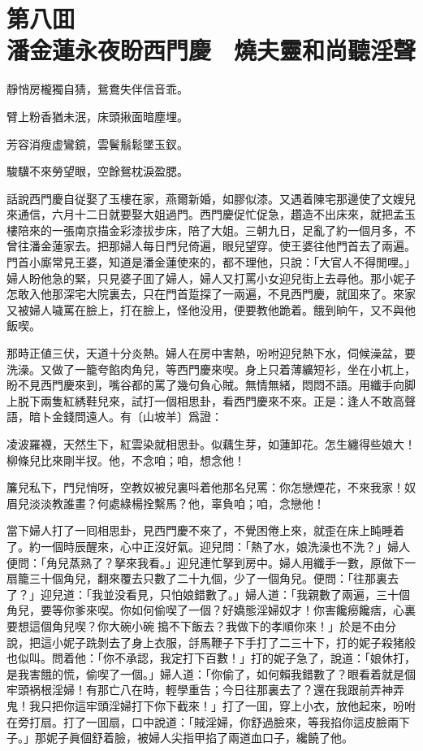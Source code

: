 
\chapter*{第八囬　\\潘金蓮永夜盼西門慶　燒夫靈和尚聽淫聲}


\begin{myquote}
靜悄房櫳獨自猜，鴛鴦失伴信音乖。

臂上粉香猶未泯，床頭揪面暗塵埋。

芳容消瘦虚鸞鏡，雲鬢鬅鬆墜玉釵。

駿驥不來勞望眼，空餘鴛枕淚盈腮。
\end{myquote}

話說西門慶自従娶了玉樓在家，燕爾新婚，如膠似漆。又遇着陳宅那邊使了文嫂兒來通信，六月十二日就要娶大姐過門。西門慶促忙促急，趲造不出床來，就把孟玉樓陪來的一張南京描金彩漆拔步床，陪了大姐。三朝九日，足亂了約一個月多，不曾往潘金蓮家去。把那婦人每日門兒倚遍，眼兒望穿。使王婆往他門首去了兩遍。門首小廝常見王婆，知道是潘金蓮使來的，都不理他，只說：「大官人不得閒哩。」婦人盼他急的緊，只見婆子囬了婦人，婦人又打罵小女迎兒街上去尋他。那小妮子怎敢入他那深宅大院裏去，只在門首踅探了一兩遍，不見西門慶，就囬來了。來家又被婦人噦罵在臉上，打在臉上，怪他没用，便要教他跪着。餓到晌午，又不與他飯喫。

那時正値三伏，天道十分炎熱。婦人在房中害熱，吩咐迎兒熱下水，伺候澡盆，要洗澡。又做了一籠夸餡肉角兒，等西門慶來喫。身上只着薄纊短衫，坐在小杌上，盼不見西門慶來到，嘴谷都的罵了幾句負心賊。無情無緒，悶悶不語。用纖手向脚上脱下兩隻紅綉鞋兒來，試打一個相思卦，看西門慶來不來。正是：逢人不敢高聲語，暗卜金錢問遠人。有〔山坡羊〕爲證：

\begin{myquote}
凌波羅襪，天然生下，紅雲染就相思卦。似藕生芽，如蓮卸花。怎生纏得些娘大！柳條兒比來剛半扠。他，不念咱；咱，想念他！

簾兒私下，門兒悄呀，空教奴被兒裏呌着他那名兒罵：你怎戀煙花，不來我家！奴眉兒淡淡教誰畫？何處綠楊拴繫馬？他，辜負咱；咱，念戀他！
\end{myquote}

當下婦人打了一囘相思卦，見西門慶不來了，不覺困倦上來，就歪在床上盹睡着了。約一個時辰醒來，心中正沒好氣。迎兒問：「熱了水，娘洗澡也不洗？」婦人便問：「角兒蒸熟了？拏來我看。」迎兒連忙拏到房中。婦人用纖手一數，原做下一扇籠三十個角兒，翻來覆去只數了二十九個，少了一個角兒。便問：「往那裏去了？」迎兒道：「我並没看見，只怕娘錯數了。」婦人道：「我親數了兩遍，三十個角兒，要等你爹來喫。你如何偷喫了一個？好嬌態淫婦奴才！你害饞癆饞痞，心裏要想這個角兒喫？你大碗小碗𠳹搗不下飯去？我做下的孝順你來！」於是不由分說，把這小妮子跣剝去了身上衣服，㧱馬鞭子下手打了二三十下，打的妮子殺猪般也似叫。問着他：「你不承認，我定打下百數！」打的妮子急了，說道：「娘休打，是我害餓的慌，偷喫了一個。」婦人道：「你偷了，如何賴我錯數了？眼看着就是個牢頭祸根淫婦！有那亡八在時，輕學重告；今日往那裏去了？還在我跟前弄神弄鬼！我只把你這牢頭淫婦打下你下截來！」打了一囬，穿上小衣，放他起來，吩咐在旁打扇。打了一囬扇，口中說道：「賊淫婦，你舒過臉來，等我掐你這皮臉兩下子。」那妮子眞個舒着臉，被婦人尖指甲掐了兩道血口子，纔饒了他。

